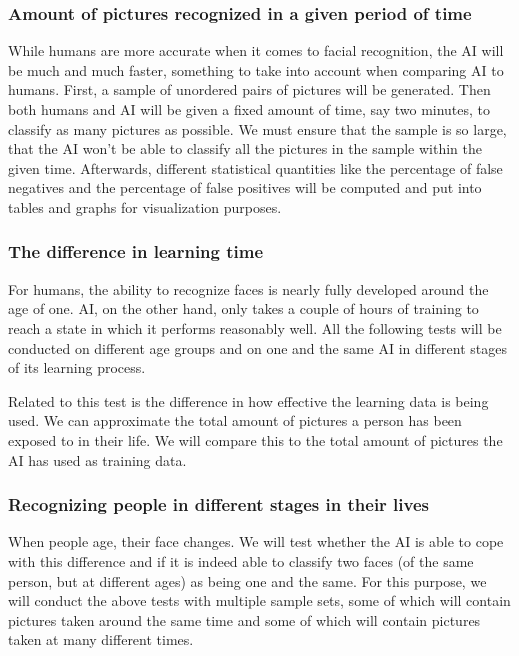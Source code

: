 \documentclass[12pt, titlepage]{article}
\begin{document}
    \subsubsection{Amount of pictures recognized in a given period of time}
    While humans are more accurate when it comes to facial recognition, the AI will be much and much faster, something to take into account when comparing AI to humans. First, a sample of unordered pairs of pictures will be generated. Then both humans and AI will be given a fixed amount of time, say two minutes, to classify as many pictures as possible. We must ensure that the sample is so large, that the AI won't be able to classify all the pictures in the sample within the given time. Afterwards, different statistical quantities like the percentage of false negatives and the percentage of false positives will be computed and put into tables and graphs for visualization purposes.
    
    \subsubsection{The difference in learning time}
    For humans, the ability to recognize faces is nearly fully developed around the age of one. AI, on the other hand, only takes a couple of hours of training to reach a state in which it performs reasonably well. All the following tests will be conducted on different age groups and on one and the same AI in different stages of its learning process.
    
    \bigskip
    Related to this test is the difference in how effective the learning data is being used. We can approximate the total amount of pictures a person has been exposed to in their life. We will compare this to the total amount of pictures the AI has used as training data.
    
    \subsubsection{Recognizing people in different stages in their lives}
    When people age, their face changes. We will test whether the AI is able to cope with this difference and if it is indeed able to classify two faces (of the same person, but at different ages) as being one and the same. For this purpose, we will conduct the above tests with multiple sample sets, some of which will contain pictures taken around the same time and some of which will contain pictures taken at many different times.
    
\end{document}
